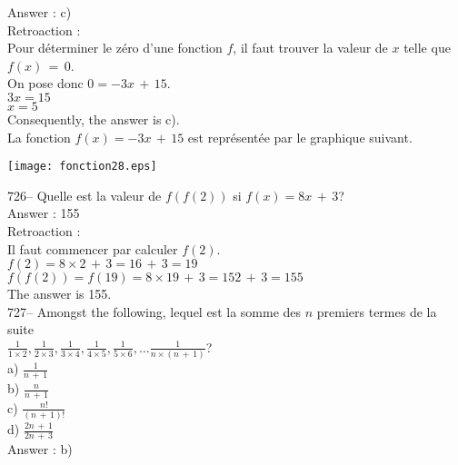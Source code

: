 ﻿\documentclass[letterpaper, 12pt]{article}
\begin{document}
Answer : c)\\

Retroaction : \\
Pour d\'eterminer le z\'ero d'une fonction $f$, il faut trouver la valeur de
$x$ telle que $f(x)\,=\,0$.\\
On pose donc $0=-3x\,+\,15$.\\
$3x=15$\\
$x=5$\\
Consequently, the answer is c).\\
La fonction $f(x)=-3x\,+\,15$ est repr\'esent\'ee par le graphique
suivant.\\
    \begin{center}
    \texttt{[image: fonction28.eps]}
    \end{center}

726-- Quelle est la valeur de $f(f(2))$ si $f(x)=8x\,+\,3$?\\

Answer : 155\\

Retroaction : \\
Il faut commencer par calculer $f(2)$.\\
$f(2)=8\times2\,+\,3=16\,+\,3=19$\\
$f(f(2))=f(19)=8\times19\,+\,3= 152\,+\,3=155$\\
The answer is 155.\\

727-- Amongst the following, lequel est la somme des $n$ premiers
termes de la suite \\$\frac{1}{1\times2}, \frac{1}{2\times3},
\frac{1}{3\times4}, \frac{1}{4\times5}, \frac{1}{5\times6}, \ldots
\frac{1}{n\times(n\,+\,1)}$?\\
a) $\frac{1}{n\,+\,1}$\\[2mm]
b) $\frac{n}{n\,+\,1}$\\[2mm]
c) $\frac{n!}{(n\,+\,1)!}$\\[2mm]
d) $\frac{2n\,+\,1}{2n\,+\,3}$\\

Answer : b)\\
\end{document}
